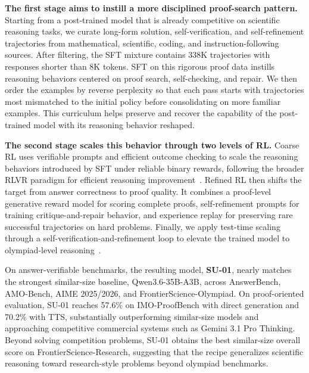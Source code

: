 \documentclass{llmxive}
\begin{document}
\textbf{The first stage aims to instill a more disciplined proof-search pattern.} 
Starting from a post-trained model that is already competitive on scientific reasoning tasks,
we curate long-form solution, self-verification, and self-refinement
trajectories from mathematical, scientific, coding, and instruction-following
sources. 
After filtering, the SFT mixture contains 338K
trajectories with responses shorter than 8K tokens. SFT on this rigorous proof
data instills reasoning behaviors centered on proof search, self-checking, and
repair. We then order the examples by reverse perplexity so
that each pass starts with trajectories most mismatched to the initial policy
before consolidating on more familiar examples. This curriculum helps preserve
and recover the capability of the post-trained model with its reasoning
behavior reshaped.

\textbf{The second stage scales this behavior through two levels of RL.}
Coarse RL uses
verifiable prompts and efficient outcome checking to scale the reasoning
behaviors introduced by SFT under reliable binary rewards, following the broader RLVR paradigm for efficient reasoning improvement~\citep{r1,shao2024deepseekmath}. 
Refined RL then shifts the target from answer correctness to proof quality.  It combines a proof-level generative reward model for scoring complete proofs,
self-refinement prompts for training critique-and-repair behavior, and
experience replay for preserving rare successful trajectories on hard
problems.
Finally, we apply test-time scaling through a self-verification-and-refinement loop to elevate the trained
model to olympiad-level reasoning~\citep{huang2025winning}.


On answer-verifiable benchmarks, the resulting model,
\textbf{SU-01}, nearly matches the strongest
similar-size baseline, Qwen3.6-35B-A3B, across AnswerBench, AMO-Bench, AIME
2025/2026, and FrontierScience-Olympiad. On proof-oriented evaluation, SU-01
reaches 57.6\% on IMO-ProofBench with direct generation and 70.2\% with TTS,
substantially outperforming similar-size models and approaching competitive
commercial systems such as Gemini 3.1 Pro Thinking. Beyond solving
competition problems, SU-01 obtains the best similar-size overall score on
FrontierScience-Research, suggesting that the recipe generalizes scientific
reasoning toward research-style problems beyond olympiad benchmarks.
\end{document}
